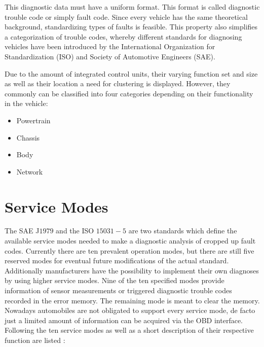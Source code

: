 This diagnostic data must have a uniform format. This format is called diagnostic trouble code or simply fault code. Since every 
vehicle has the same theoretical background, standardizing types of faults is feasible. This property also simplifies a categorization 
of trouble codes, whereby different standards for diagnosing vehicles have been introduced by the International Organization for 
Standardization (ISO) and Society of Automotive Engineers (SAE). 

Due to the amount of integrated control units, their varying function set and size as well as their location a need for clustering is 
displayed. However, they commonly can be classified into four categories depending on their functionality in the vehicle:
\begin{itemize}
 \item Powertrain 
 \item Chassis 
 \item Body 
 \item Network
\end{itemize}

\section{Service Modes}
\label{sec:servicemodes}

The SAE J$1979$ and the ISO $15031-5$ are two standards which define the available service modes needed to make a diagnostic analysis of cropped up fault codes. Currently there are ten prevalent operation modes, but there are still five reserved modes for eventual future modifications of the actual standard. Additionally manufacturers have the possibility to implement their own diagnoses by using higher service modes.
Nine of the ten specified modes provide information of sensor measurements or triggered diagnostic trouble codes recorded in the error memory. The remaining mode is meant to clear the memory. Nowadays automobiles are not obligated to support every service  mode, de facto just a limited amount of information can be acquired via the OBD interface.
Following the ten service modes as well as a short description of their respective function are listed \cite{SCHAFOBD2}:

